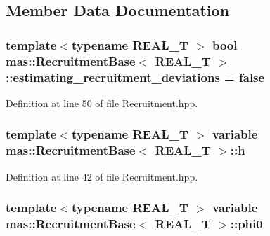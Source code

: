 \subsection{Member Data Documentation}
\hypertarget{structmas_1_1_recruitment_base_a84eb1f6997fa59d983ba24a1d2d36f5e}{
\subsubsection[{estimating\-\_\-recruitment\-\_\-deviations}]{\setlength{\rightskip}{0pt plus 5cm}template$<$typename R\-E\-A\-L\-\_\-\-T $>$ bool {\bf mas\-::\-Recruitment\-Base}$<$ R\-E\-A\-L\-\_\-\-T $>$\-::estimating\-\_\-recruitment\-\_\-deviations = false}}\label{structmas_1_1_recruitment_base_a84eb1f6997fa59d983ba24a1d2d36f5e}


Definition at line 50 of file Recruitment.\-hpp.

\hypertarget{structmas_1_1_recruitment_base_ac460098ea97bddb9f1a41bb854d8f89d}{
\subsubsection[{h}]{\setlength{\rightskip}{0pt plus 5cm}template$<$typename R\-E\-A\-L\-\_\-\-T $>$ {\bf variable} {\bf mas\-::\-Recruitment\-Base}$<$ R\-E\-A\-L\-\_\-\-T $>$\-::h}}\label{structmas_1_1_recruitment_base_ac460098ea97bddb9f1a41bb854d8f89d}


Definition at line 42 of file Recruitment.\-hpp.

\hypertarget{structmas_1_1_recruitment_base_a4e6c20c02bc08e1ca5f3489992fd8c2f}{
\subsubsection[{phi0}]{\setlength{\rightskip}{0pt plus 5cm}template$<$typename R\-E\-A\-L\-\_\-\-T $>$ {\bf variable} {\bf mas\-::\-Recruitment\-Base}$<$ R\-E\-A\-L\-\_\-\-T $>$\-::phi0}}\label{structmas_1_1_recruitment_base_a4e6c20c02bc08e1ca5f3489992fd8c2f}


